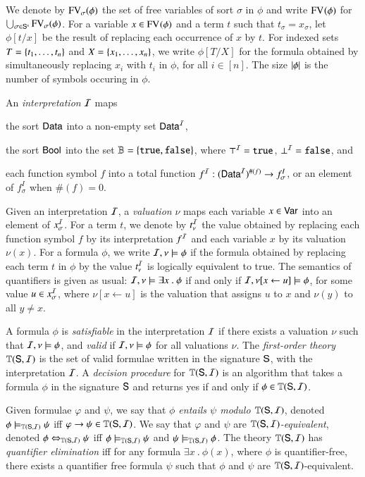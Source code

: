 \documentclass{llncs}
\begin{document}
We denote by $\mathrm{FV}_{\sigma}(\phi)$ the set of free variables of sort
$\sigma$ in $\phi$ and write $\mathrm{FV}_{}(\phi)$ for $\bigcup_{\sigma \in
  \mathsf{S}^\mathrm{s}} \mathrm{FV}_{\sigma}(\phi)$. For a variable $x \in
\mathrm{FV}_{}(\phi)$ and a term $t$ such that $t_\sigma = x_\sigma$, let
$\phi[t/x]$ be the result of replacing each occurrence of $x$ by
$t$. For indexed sets $T=\{ t_1,\ldots,t_n \}$ and
$X=\{ x_1,\ldots,x_n \}$, we write $\phi[T/X]$ for the formula
obtained by simultaneously replacing $x_i$ with $t_i$ in $\phi$, for
all $i\in[n]$. The size ${|{\phi}|}$ is the number of symbols occuring
in $\phi$.

An \emph{interpretation} $\mathcal{I}$ maps\begin{inparaenum}[(1)]
\item the sort $\mathsf{Data}$ into a non-empty set $\mathsf{Data}^{\mathcal{I}}$, 
%
\item the sort $\mathsf{Bool}$ into the set $\mathbb{B} = \{ \mathtt{true},\mathtt{false} \}$, where
  $\top^{\mathcal{I}} = \mathtt{true}$, $\bot^{\mathcal{I}} = \mathtt{false}$, and
%
\item each function symbol $f$ into a total function $f^{\mathcal{I}} :
  (\mathsf{Data}^{\mathcal{I}})^{\#(f)} \rightarrow f_\sigma^I$, or an element of
  $f_\sigma^I$ when $\#(f)=0$.
\end{inparaenum}
Given an interpretation $\mathcal{I}$, a \emph{valuation} $\nu$ maps each
variable $x \in \mathsf{Var}$ into an element of $x_\sigma^{\mathcal{I}}$. For a term
$t$, we denote by $t^{\mathcal{I}}_\nu$ the value obtained by replacing each
function symbol $f$ by its interpretation $f^{\mathcal{I}}$ and each variable $x$
by its valuation $\nu(x)$. For a formula $\phi$, we write $\mathcal{I},\nu
\models \phi$ if the formula obtained by replacing each term $t$ in
$\phi$ by the value $t^{\mathcal{I}}_\nu$ is logically equivalent to true.  The
semantics of quantifiers is given as usual: $\mathcal{I},\nu \models \exists x
~.~ \phi$ if and only if $\mathcal{I},\nu[x \leftarrow u] \models \phi$, for
some value $u \in x_\sigma^{\mathcal{I}}$, where $\nu[x \leftarrow u]$ is the
valuation that assigns $u$ to $x$ and $\nu(y)$ to all $y \neq x$.

A formula $\phi$ is \emph{satisfiable} in the interpretation $\mathcal{I}$ if
there exists a valuation $\nu$ such that $\mathcal{I},\nu \models \phi$, and
\emph{valid} if $\mathcal{I},\nu \models \phi$ for all valuations $\nu$.  The
\emph{first-order theory} $\mathbb{T}(\mathsf{S},\mathcal{I})$ is the set of valid
formulae written in the signature $\mathsf{S}$, with the interpretation
$\mathcal{I}$. A \emph{decision procedure} for $\mathbb{T}(\mathsf{S},\mathcal{I})$ is an
algorithm that takes a formula $\phi$ in the signature $\mathsf{S}$ and
returns yes if and only if $\phi \in \mathbb{T}(\mathsf{S},\mathcal{I})$.

Given formulae $\varphi$ and $\psi$, we say that \emph{$\phi$ entails
  $\psi$ modulo $\mathbb{T}(\mathsf{S},\mathcal{I})$}, denoted $\phi
\models_{\mathbb{T}(\mathsf{S},\mathcal{I})} \psi$ iff $\varphi \rightarrow \psi \in
\mathbb{T}(\mathsf{S},\mathcal{I})$. We say that $\varphi$ and $\psi$ are
\emph{$\mathbb{T}(\mathsf{S},\mathcal{I})$-equivalent}, denoted $\phi \Leftrightarrow_{\mathbb{T}(\mathsf{S},\mathcal{I})} \psi$ iff
$\phi \models_{\mathbb{T}(\mathsf{S},\mathcal{I})} \psi$ and $\psi
\models_{\mathbb{T}(\mathsf{S},\mathcal{I})} \phi$. The theory $\mathbb{T}(\mathsf{S},\mathcal{I})$ has
\emph{quantifier elimination} iff for any formula $\exists x ~.~
\phi(x)$, where $\phi$ is quantifier-free, there exists a quantifier
free formula $\psi$ such that $\phi$ and $\psi$ are
$\mathbb{T}(\mathsf{S},\mathcal{I})$-equivalent.
\end{document}
